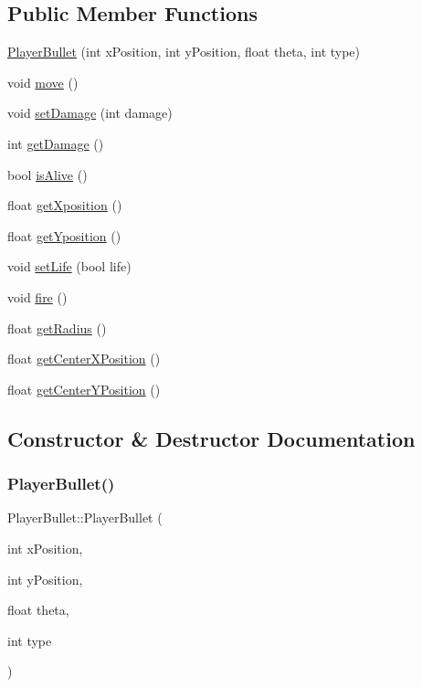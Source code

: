 \subsection*{Public Member Functions}
\begin{DoxyCompactItemize}
\item 
\hyperlink{class_player_bullet_ab48e600824aa9c70206810e37f918d52}{Player\+Bullet} (int x\+Position, int y\+Position, float theta, int type)
\item 
void \hyperlink{class_player_bullet_a8469319697d70e04399d8aaac3902c80}{move} ()
\item 
void \hyperlink{class_player_bullet_a09347ab7665742fc7d492fe26c3a6bce}{set\+Damage} (int damage)
\item 
int \hyperlink{class_player_bullet_a55375b5c3f4f87d00daba1cda12b1e79}{get\+Damage} ()
\item 
bool \hyperlink{class_player_bullet_ab4e6b1485e9a63ddc00effc7532a9b09}{is\+Alive} ()
\item 
float \hyperlink{class_player_bullet_aa9462c44892190316ee479a18693b6ad}{get\+Xposition} ()
\item 
float \hyperlink{class_player_bullet_a240cab35d5d909366986b8661ee65d3c}{get\+Yposition} ()
\item 
void \hyperlink{class_player_bullet_af713549c4bb9a2400a7929564f5b81ff}{set\+Life} (bool life)
\item 
void \hyperlink{class_player_bullet_a4ef09e533d8d3016d7e08d9efae238ff}{fire} ()
\item 
float \hyperlink{class_player_bullet_a1ff56e38b1447500d2887b6fe1eeb674}{get\+Radius} ()
\item 
float \hyperlink{class_player_bullet_a73c27dca47ea3fdcecd82ce4b2089c4a}{get\+Center\+X\+Position} ()
\item 
float \hyperlink{class_player_bullet_a7ad2bc922595b9a11373fd42666926ef}{get\+Center\+Y\+Position} ()
\end{DoxyCompactItemize}


\subsection{Constructor \& Destructor Documentation}
\mbox{\label{class_player_bullet_ab48e600824aa9c70206810e37f918d52}} 
\subsubsection{\texorpdfstring{Player\+Bullet()}{PlayerBullet()}}
{\footnotesize\ttfamily Player\+Bullet\+::\+Player\+Bullet (\begin{DoxyParamCaption}\item[{int}]{x\+Position,  }\item[{int}]{y\+Position,  }\item[{float}]{theta,  }\item[{int}]{type }\end{DoxyParamCaption})}



